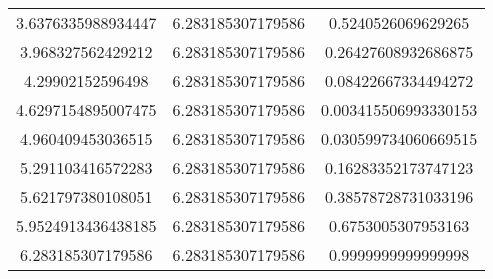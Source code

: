 \begin{table}
\begin{tabular}{ccc}
3.6376335988934447 & 6.283185307179586 & 0.5240526069629265 \\
3.968327562429212 & 6.283185307179586 & 0.26427608932686875 \\
4.29902152596498 & 6.283185307179586 & 0.08422667334494272 \\
4.6297154895007475 & 6.283185307179586 & 0.003415506993330153 \\
4.960409453036515 & 6.283185307179586 & 0.030599734060669515 \\
5.291103416572283 & 6.283185307179586 & 0.16283352173747123 \\
5.621797380108051 & 6.283185307179586 & 0.38578728731033196 \\
5.9524913436438185 & 6.283185307179586 & 0.6753005307953163 \\
6.283185307179586 & 6.283185307179586 & 0.9999999999999998 \\
\end{tabular}
\end{table}
